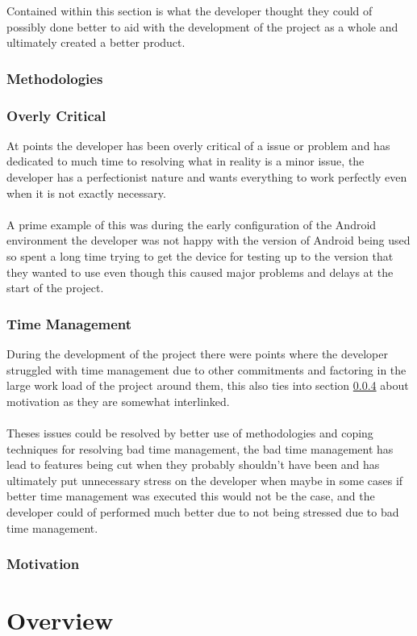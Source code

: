 Contained within this section is what the developer thought they could of possibly done better to aid with the development of the project as a whole and ultimately created a better product. 

\subsubsection{Methodologies}

\subsubsection{Overly Critical}

At points the developer has been overly critical of a issue or problem and has dedicated to much time to resolving what in reality is a minor issue, the developer has a perfectionist nature and wants everything to work perfectly even when it is not exactly necessary.\\
\\
A prime example of this was during the early configuration of the Android environment the developer was not happy with the version of Android being used so spent a long time trying to get the device for testing up to the version that they wanted to use even though this caused major problems and delays at the start of the project.

\subsubsection{Time Management}

During the development of the project there were points where the developer struggled with time management due to other commitments and factoring in the large work load of the project around them, this also ties into section \ref{sec:motivation} about motivation as they are somewhat interlinked.\\
\\
Theses issues could be resolved by better use of methodologies and coping techniques for resolving bad time management, the bad time management has lead to features being cut when they probably shouldn't have been and has ultimately put unnecessary stress on the developer when maybe in some cases if better time management was executed this would not be the case, and the developer could of performed much better due to not being stressed due to bad time management.

\subsubsection{Motivation}
\label{sec:motivation}


\section{Overview}


